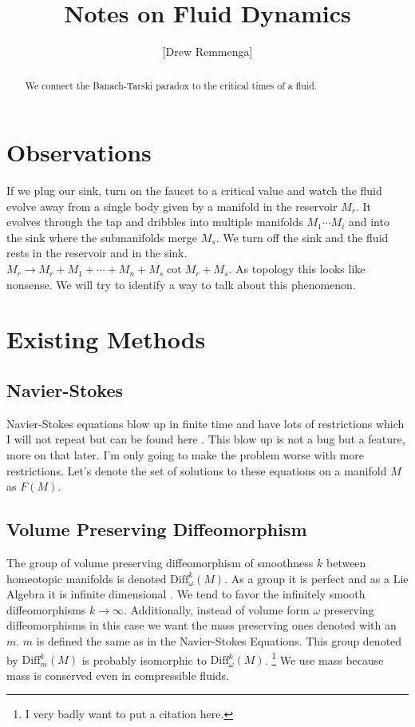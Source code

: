 \documentclass[10pt, oneside]{article}
\title{Notes on Fluid Dynamics}
\author{[Drew Remmenga]}
\begin{document}
\maketitle
\begin{abstract}
    We connect the Banach-Tarski paradox to the critical times of a fluid.
\end{abstract}
\section*{Observations}
   If we plug our sink, turn on the faucet to a critical value and watch the fluid evolve away from a single body given by a manifold in the reservoir $M_r$. It evolves through the tap and dribbles into multiple manifolds $M_1 \cdots M_i$ and into the sink where the submanifolds merge $M_s$.
   We turn off the sink and the fluid rests in the reservoir and in the sink. $M_r \to M_r + M_1 + \cdots + M_n + M_s \cot M_r + M_s$. As topology this looks like nonsense. We will try to identify a way to talk about this phenomenon.
\section*{Existing Methods}
\subsection*{Navier-Stokes}
   Navier-Stokes equations blow up in finite time \cite{tao2015finitetimeblowupaveraged} and have lots of restrictions which I will not repeat but can be found here \cite{tao2015finitetimeblowupaveraged}. This blow up is not a bug but a feature, more on that later.
   I'm only going to make the problem worse with more restrictions. Let's denote the set of solutions to these equations on a manifold $M$ as $F(M)$.
\subsection*{Volume Preserving Diffeomorphism}
   The group of volume preserving diffeomorphism of smoothness $k$ between homeotopic manifolds is denoted $\text{Diff}^k_\omega(M)$. As a group it is perfect and as a Lie Algebra it is infinite dimensional \cite{Banyaga1997}. We tend to favor the infinitely smooth diffeomorphisms $k \to \infty$.
   Additionally, instead of volume form $\omega$ preserving diffeomorphisms in this case we want the mass preserving ones denoted with an $m$. $m$ is defined the same as in the Navier-Stokes Equations. This group denoted by $\text{Diff}^k_m(M)$ is probably isomorphic to $\text{Diff}^k_\omega(M)$. \footnote{I very badly want to put a citation here.}
   We use mass because mass is conserved even in compressible fluids.
\end{document}
